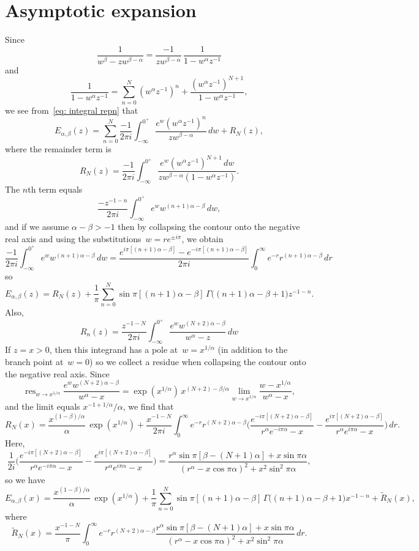 \documentclass[12pt,a4paper]{article}
\DeclareMathOperator*{\res}{res}
\begin{document}
\section{Asymptotic expansion}
Since
\[
\frac{1}{w^\beta-zw^{\beta-\alpha}}=\frac{-1}{zw^{\beta-\alpha}}
    \,\frac{1}{1-w^\alpha z^{-1}}
\]
and
\[
\frac{1}{1-w^\alpha z^{-1}}=\sum_{n=0}^N(w^\alpha z^{-1})^n
    +\frac{(w^\alpha z^{-1})^{N+1}}{1-w^\alpha z^{-1}},
\]
we see from~\eqref{eq: integral repn} that
\[
E_{\alpha,\beta}(z)=\sum_{n=0}^N\frac{-1}{2\pi i}\int_{-\infty}^{0^+}
    \frac{e^w(w^\alpha z^{-1})^n}{zw^{\beta-\alpha}}\,dw+R_N(z),
\]
where the remainder term is
\[
R_N(z)=\frac{-1}{2\pi i}\int_{-\infty}^{0^+}
    \frac{e^w(w^\alpha z^{-1})^{N+1}\,dw}{zw^{\beta-\alpha}(1-w^\alpha z^{-1})}.
\]
The $n$th term equals
\[
\frac{-z^{-1-n}}{2\pi i}\int_{-\infty}^{0^+}e^w w^{(n+1)\alpha-\beta}\,dw,
\]
and if we assume $\alpha-\beta>-1$ then by collapsing the contour onto the 
negative real axis and using the substitutions~$w=re^{\pm i\pi}$, we obtain
\[
\frac{-1}{2\pi i}\int_{-\infty}^{0^+}e^w w^{(n+1)\alpha-\beta}\,dw
    =\frac{e^{i\pi[(n+1)\alpha-\beta]}-e^{-i\pi[(n+1)\alpha-\beta]}}{2\pi i}
    \int_0^\infty e^{-r}r^{(n+1)\alpha-\beta}\,dr
\]
so
\[
E_{\alpha,\beta}(z)=R_N(z)+\frac{1}{\pi}\sum_{n=0}^N
    \sin\pi[(n+1)\alpha-\beta]\,\Gamma\bigl((n+1)\alpha-\beta+1\bigr)z^{-1-n}.
\]
Also,
\[
R_n(z)=\frac{z^{-1-N}}{2\pi i}\int_{-\infty}^{0^+}
    \frac{e^w w^{(N+2)\alpha-\beta}}{w^\alpha-z}\,dw
\]
If $z=x>0$, then this integrand has a pole at~$w=x^{1/\alpha}$ (in addition to
the branch point at~$w=0$) so we collect a residue when collapsing the contour 
onto the negative real axis.  Since
\[
\res_{w\to x^{1/\alpha}}\frac{e^w w^{(N+2)\alpha-\beta}}{w^\alpha-x}
    =\exp(x^{1/\alpha})\,x^{(N+2)-\beta/\alpha}\lim_{w\to x^{1/\alpha}}
    \frac{w-x^{1/\alpha}}{w^\alpha-x},
\]
and the limit equals $x^{-1+1/\alpha}/\alpha$, we find that
\[
R_N(x)=\frac{x^{(1-\beta)/\alpha}}{\alpha}\,\exp(x^{1/\alpha})
    +\frac{x^{-1-N}}{2\pi i}\int_0^\infty e^{-r}r^{(N+2)\alpha-\beta}\biggr(
     \frac{e^{-i\pi[(N+2)\alpha-\beta]}}{r^\alpha e^{-i\pi\alpha}-x}
    -\frac{e^{i\pi[(N+2)\alpha-\beta]}}{r^\alpha e^{i\pi\alpha}-x}\biggr)\,dr.
\]
Here,
\[
\frac{1}{2i}\biggr(
     \frac{e^{-i\pi[(N+2)\alpha-\beta]}}{r^\alpha e^{-i\pi\alpha}-x}
    -\frac{e^{i\pi[(N+2)\alpha-\beta]}}{r^\alpha e^{i\pi\alpha}-x}\biggr)
    =\frac{r^\alpha\sin\pi[\beta-(N+1)\alpha]+x\sin\pi\alpha}%
{(r^\alpha-x\cos\pi\alpha)^2+x^2\sin^2\pi\alpha},
\] 
so we have
\[
E_{\alpha,\beta}(x)=\frac{x^{(1-\beta)/\alpha}}{\alpha}\,\exp(x^{1/\alpha})
    +\frac{1}{\pi}\sum_{n=0}^N
    \sin\pi[(n+1)\alpha-\beta]\,\Gamma\bigl((n+1)\alpha-\beta+1\bigr)x^{-1-n}
    +\tilde R_N(x),
\]
where
\[
\tilde R_N(x)=\frac{x^{-1-N}}{\pi}\int_0^\infty e^{-r}r^{(N+2)\alpha-\beta}
    \frac{r^\alpha\sin\pi[\beta-(N+1)\alpha]+x\sin\pi\alpha}%
{(r^\alpha-x\cos\pi\alpha)^2+x^2\sin^2\pi\alpha}\,dr.
\]
\end{document}
